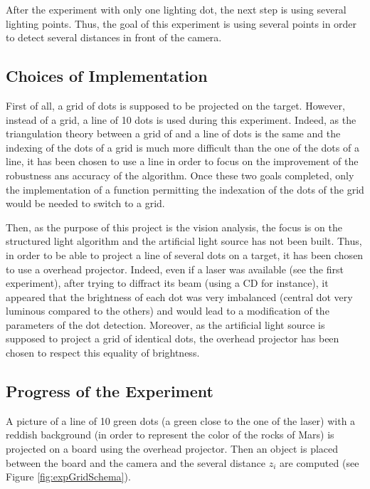 After the experiment with only one lighting dot, the next step is using several lighting points. Thus, the goal of this experiment is using several points in order to detect several distances in front of the camera.

\subsection{Choices of Implementation}
First of all, a grid of dots is supposed to be projected on the target. However, instead of a grid, a line of 10 dots is used during this experiment. Indeed, as the triangulation theory between a grid of and a line of dots is the same and the indexing of the dots of a grid is much more difficult than the one of the dots of a line, it has been chosen to use a line in order to focus on the improvement of the robustness ans accuracy of the algorithm. Once these two goals completed, only the implementation of a function permitting the indexation of the dots of the grid would be needed to switch to a grid.

Then, as the purpose of this project is the vision analysis, the focus is on the structured light algorithm and the artificial light source has not been built. Thus, in order to be able to project a line of several dots on a target, it has been chosen to use a overhead projector. Indeed, even if a laser was available (see the first experiment), after trying to diffract its beam (using a CD for instance), it appeared that the brightness of each dot was very imbalanced (central dot very luminous compared to the others) and would lead to a modification of the parameters of the dot detection. Moreover, as the artificial light source is supposed to project a grid of identical dots, the overhead projector has been chosen to respect this equality of brightness.


\subsection{Progress of the Experiment}
A picture of a line of 10 green dots (a green close to the one of the laser) with a reddish background (in order to represent the color of the rocks of Mars) is projected on a board using the overhead projector. Then an object is placed between the board and the camera and the several distance $z_i$ are computed (see Figure \ref{fig:expGridSchema}).


